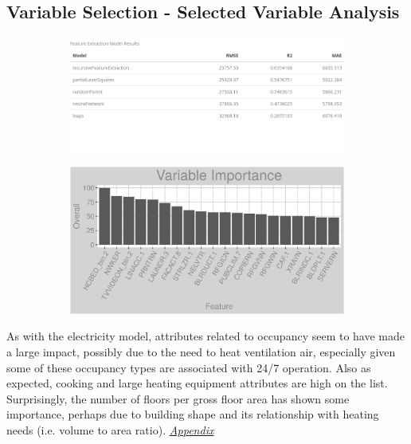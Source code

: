 \subsection{Variable Selection - Selected Variable Analysis}
\begin{figure}[h]
\begin{subfigure}{1\textwidth}
\centering
\includegraphics[width=.6\textwidth, height=0.2\textheight]{Images/natural_gas_fe_summary.png}
\end{subfigure}
\begin{subfigure}{1\textwidth}
\centering
\includegraphics[width=.99\textwidth, height=0.3\textheight]{Images/natural_gas_all_vars.png}
\end{subfigure}
\end{figure}
As with the electricity model, attributes related to occupancy seem to have made a large impact, possibly due to the need to heat ventilation air, especially given some of these occupancy types are associated with 24/7 operation.  Also as expected, cooking and large heating equipment attributes are high on the list.  Surprisingly, the number of floors per gross floor area has shown some importance, perhaps due to building shape and its relationship with heating needs (i.e. volume to area ratio). \textit{\hyperref[appendix:electricity:sva]{Appendix}}